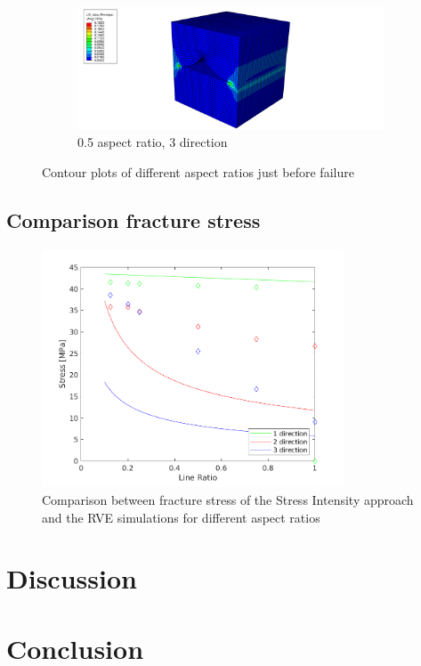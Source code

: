 \begin{figure}
  \begin{subfigure}[b]{0.80\textwidth}
    \includegraphics[width=\textwidth]{chapter_7_non-elasticmodelling/figures/1p3.png}
    \caption{0.5 aspect ratio, 3 direction}
  \end{subfigure}
  \caption{Contour plots of different aspect ratios just before failure}
  \label{fig:Contourplot}
\end{figure}

\subsection{Comparison fracture stress}

\begin{figure}[H]
    \centering
    \includegraphics[width=0.80\textwidth]{chapter_7_non-elasticmodelling/figures/yieldstress.png}
    \caption{Comparison between fracture stress of the Stress Intensity approach and the RVE simulations for different aspect ratios}
    \label{fig:ComparisonSS}
\end{figure}

\section{Discussion}

\section{Conclusion}





